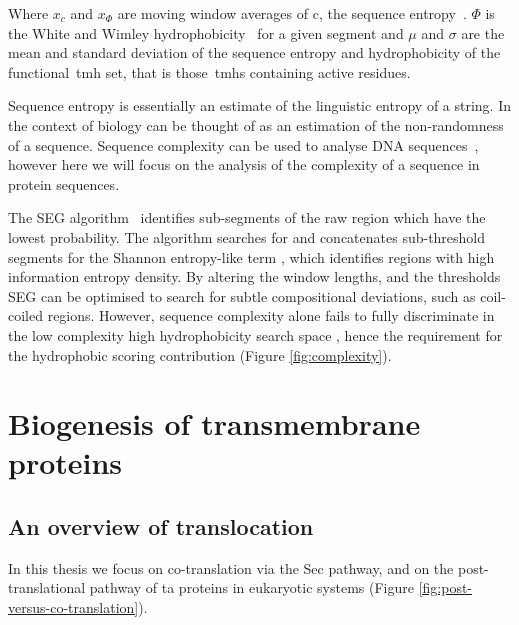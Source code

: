 Where $x_c$ and $x_\Phi$ are moving window averages of c, the sequence entropy~\cite{Wootton1996}. $\Phi$ is the White and Wimley hydrophobicity~\cite{White1999} for a given segment and $\mu$ and $\sigma$ are the mean and standard deviation of the sequence entropy and hydrophobicity of the functional~\gls{tmh} set, that is those~\gls{tmh}s containing active residues.

Sequence entropy is essentially an estimate of the linguistic entropy of a string.
In the context of biology can be thought of as an estimation of the non-randomness of a sequence.
Sequence complexity can be used to analyse DNA sequences~\cite{Pinho2013, Oliver1993, Troyanskaya2002}, however here we will focus on the analysis of the complexity of a sequence in protein sequences.

The SEG algorithm~\cite{WOOTTON1994269, Wootton1996} identifies sub-segments of the raw region which have the lowest probability.
The algorithm searches for and concatenates sub-threshold segments for the Shannon entropy-like term \cite{Shannon1948}, which identifies regions with high information entropy density.
By altering the window lengths, and the thresholds SEG can be optimised to search for subtle compositional deviations, such as coil-coiled regions.
However, sequence complexity alone fails to fully discriminate in the low complexity high hydrophobicity search space \cite{Wong2010}, hence the requirement for the hydrophobic scoring contribution (Figure \ref{fig:complexity}).


\section{Biogenesis of transmembrane proteins}
\subsection{An overview of translocation}
In this thesis we focus on co\--translation via the Sec pathway, and on the post\--translational pathway of \gls{ta} proteins in eukaryotic systems (Figure \ref{fig:post-versus-co-translation}).


